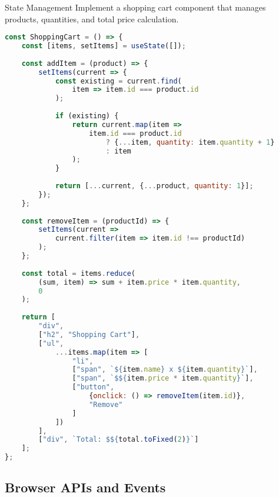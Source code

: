 \begin{example2}{State Management}
Implement a shopping cart component that manages products, quantities, and total price calculation.

\begin{lstlisting}[language=JavaScript, style=basesmol]
const ShoppingCart = () => {
    const [items, setItems] = useState([]);
    
    const addItem = (product) => {
        setItems(current => {
            const existing = current.find(
                item => item.id === product.id
            );
            
            if (existing) {
                return current.map(item =>
                    item.id === product.id
                        ? {...item, quantity: item.quantity + 1}
                        : item
                );
            }
            
            return [...current, {...product, quantity: 1}];
        });
    };
    
    const removeItem = (productId) => {
        setItems(current =>
            current.filter(item => item.id !== productId)
        );
    };
    
    const total = items.reduce(
        (sum, item) => sum + item.price * item.quantity,
        0
    );
    
    return [
        "div",
        ["h2", "Shopping Cart"],
        ["ul",
            ...items.map(item => [
                "li",
                ["span", `${item.name} x ${item.quantity}`],
                ["span", `$${item.price * item.quantity}`],
                ["button", 
                    {onclick: () => removeItem(item.id)},
                    "Remove"
                ]
            ])
        ],
        ["div", `Total: $${total.toFixed(2)}`]
    ];
};
\end{lstlisting}
\end{example2}

\subsection{Browser APIs and Events}

